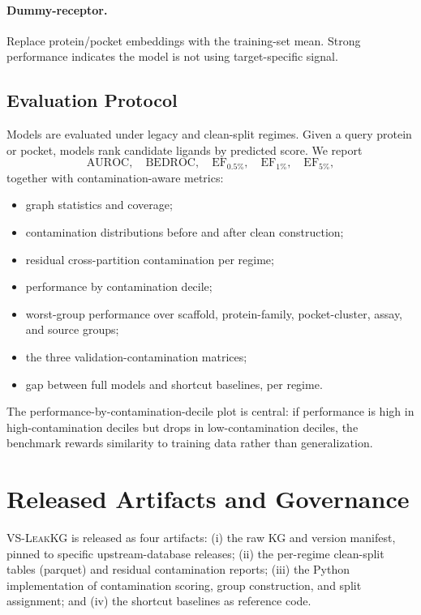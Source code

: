 \documentclass[11pt]{article}
\begin{document}
\paragraph{Dummy-receptor.} Replace protein/pocket embeddings with the training-set mean. Strong performance indicates the model is not using target-specific signal.

\subsection{Evaluation Protocol}

Models are evaluated under legacy and clean-split regimes. Given a query protein or pocket, models rank candidate ligands by predicted score. We report
\[
\mathrm{AUROC}, \quad \mathrm{BEDROC}, \quad \mathrm{EF}_{0.5\%}, \quad \mathrm{EF}_{1\%}, \quad \mathrm{EF}_{5\%},
\]
together with contamination-aware metrics:
\begin{itemize}[leftmargin=*]
    \item graph statistics and coverage;
    \item contamination distributions before and after clean construction;
    \item residual cross-partition contamination per regime;
    \item performance by contamination decile;
    \item worst-group performance over scaffold, protein-family, pocket-cluster, assay, and source groups;
    \item the three validation-contamination matrices;
    \item gap between full models and shortcut baselines, per regime.
\end{itemize}
The performance-by-contamination-decile plot is central: if performance is high in high-contamination deciles but drops in low-contamination deciles, the benchmark rewards similarity to training data rather than generalization.

\section{Released Artifacts and Governance}

\textsc{VS-LeakKG} is released as four artifacts: (i) the raw KG and version manifest, pinned to specific upstream-database releases; (ii) the per-regime clean-split tables (parquet) and residual contamination reports; (iii) the Python implementation of contamination scoring, group construction, and split assignment; and (iv) the shortcut baselines as reference code.
\end{document}
